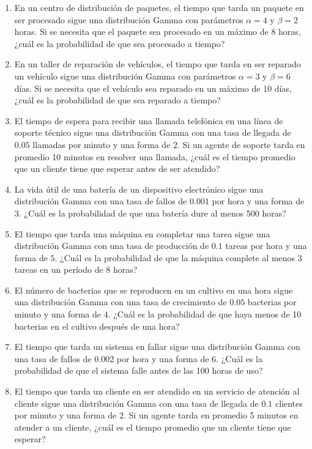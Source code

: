 \begin{Ejer}
\begin{enumerate}
\item En un centro de distribución de paquetes, el tiempo que tarda un paquete en ser procesado sigue una distribución Gamma con parámetros $\alpha = 4$ y $\beta = 2$ horas. Si se necesita que el paquete sea procesado en un máximo de 8 horas, ¿cuál es la probabilidad de que sea procesado a tiempo?

\item En un taller de reparación de vehículos, el tiempo que tarda en ser reparado un vehículo sigue una distribución Gamma con parámetros $\alpha = 3$ y $\beta = 6$ días. Si se necesita que el vehículo sea reparado en un máximo de 10 días, ¿cuál es la probabilidad de que sea reparado a tiempo?

\item El tiempo de espera para recibir una llamada telefónica en una línea de soporte técnico sigue una distribución Gamma con una tasa de llegada de $0.05$ llamadas por minuto y una forma de $2$. Si un agente de soporte tarda en promedio 10 minutos en resolver una llamada, ¿cuál es el tiempo promedio que un cliente tiene que esperar antes de ser atendido?

\item La vida útil de una batería de un dispositivo electrónico sigue una distribución Gamma con una tasa de fallos de $0.001$ por hora y una forma de $3$. ¿Cuál es la probabilidad de que una batería dure al menos 500 horas?

\item El tiempo que tarda una máquina en completar una tarea sigue una distribución Gamma con una tasa de producción de $0.1$ tareas por hora y una forma de $5$. ¿Cuál es la probabilidad de que la máquina complete al menos 3 tareas en un período de 8 horas?

\item El número de bacterias que se reproducen en un cultivo en una hora sigue una distribución Gamma con una tasa de crecimiento de $0.05$ bacterias por minuto y una forma de $4$. ¿Cuál es la probabilidad de que haya menos de 10 bacterias en el cultivo después de una hora?

\item El tiempo que tarda un sistema en fallar sigue una distribución Gamma con una tasa de fallos de $0.002$ por hora y una forma de $6$. ¿Cuál es la probabilidad de que el sistema falle antes de las 100 horas de uso?

\item El tiempo que tarda un cliente en ser atendido en un servicio de atención al cliente sigue una distribución Gamma con una tasa de llegada de $0.1$ clientes por minuto y una forma de $2$. Si un agente tarda en promedio 5 minutos en atender a un cliente, ¿cuál es el tiempo promedio que un cliente tiene que esperar?

\end{enumerate}
\end{Ejer} 


